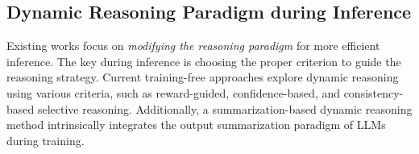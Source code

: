 \subsection{Dynamic Reasoning Paradigm during Inference}
\label{sec:dynamic}

Existing works focus on \textit{modifying the reasoning paradigm} for more efficient inference. The key during inference is choosing the proper criterion to guide the reasoning strategy. Current training-free approaches explore dynamic reasoning using various criteria, such as reward-guided, confidence-based, and consistency-based selective reasoning. Additionally, a summarization-based dynamic reasoning method intrinsically integrates the output summarization paradigm of LLMs during training.



